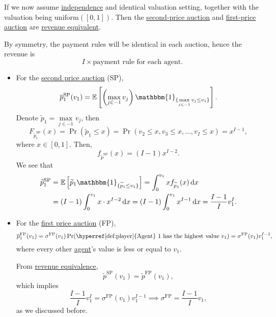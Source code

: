 If we now assume \hyperref[def:independent]{independence} and identical valuation setting, together with the valuation being
\(\mathrm{uniform}([0,1])\). Then the \hyperref[eg:second-price-auction]{second-price auction} and \hyperref[eg:first-price-auction]{first-price auction}
are \hyperref[rmk:revenue-equivalence]{revenue equivalent}.

By symmetry, the payment rules will be identical in each auction, hence the revenue is
\[
	I\times \text{payment rule for each agent}.
\]

\begin{itemize}
	\item For the \hyperref[eg:second-price-auction]{second price auction} (SP),
	      \[
		      \overline{p}_1^{\mathrm{SP}}(v_1) = \mathbb{E}\left[\left(\max_{j\in -1}v_{j}\right)\mathbbm{1}_{\{ \max\limits_{j\in -1} v_{j}\leq v_1\}}  \right] .
	      \]
	      Denote \(\widetilde{p}_1 = \max\limits_{j\in -1} v_{j}\), then
	      \[
		      F_{\widetilde{p}^{\mathrm{SP}}_i}(x) = \Pr(\widetilde{p}_1\leq x) = \Pr(v_2\leq x, v_3\leq x, \ldots , v_I\leq x) = x^{I-1},
	      \]
	      where \(x\in [0, 1]\). Then,
	      \[
		      f_{\widetilde{p}^{\mathrm{SP}}}(x) = (I - 1)x^{I-2}.
	      \]
	      We see that
	      \[
		      \begin{split}
			      \widetilde{p}_1^{\mathrm{SP}} &= \mathbb{E}\left[\widetilde{p}_{1}\mathbbm{1}_{\{ \widetilde{p}_1\leq v_1 \}} \right]
			      =\int_0^{v_1} xf_{\widetilde{p}_1}(x)\,\mathrm{d}x\\
			      &= (I - 1)\int_0^{v_1}x\cdot x^{I-2}\,\mathrm{d}x
			      = (I - 1)\int_0^{v_1}x^{I-1}\,\mathrm{d}x
			      = \frac{I-1}{I}v_1^I.
		      \end{split}
	      \]
	\item For the \hyperref[eg:first-price-auction]{first price auction} (FP),
	      \[
		      \overline{p}_1^{\mathrm{FP}}(v_1)
		      = \sigma^{\mathrm{FP}}(v_1)\Pr(\text{\hyperref[def:player]{Agent} 1 has the highest value \(v_1\)})
		      = \sigma^{\mathrm{FP}}(v_1)v_1^{I-1},
	      \]
	      where every other \hyperref[def:player]{agent}'s value is less or equal to \(v_1\).

	      From \hyperref[rmk:revenue-equivalence]{revenue equivalence},
	      \[
		      \widetilde{p}^{\mathrm{SP}}(v_1) = \widetilde{p}^{\mathrm{FP}}(v_1),
	      \]
	      which implies
	      \[
		      \frac{I-1}{I}v_{1}^I = \sigma^{\mathrm{FP}}(v_1)v_1^{I-1} \implies \sigma^{\mathrm{FP}} = \frac{I-1}{I}v_1,
	      \]
	      as we discussed before.
\end{itemize}

